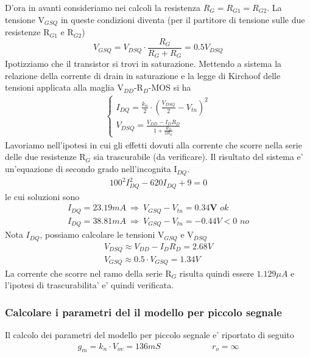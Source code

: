 \documentclass[a4paper,10pt]{article}
\begin{document}
D'ora in avanti consideriamo nei calcoli la resistenza $R_G=R_{G1}=R_{G2}$. La tensione V$_{GSQ}$ in queste condizioni diventa (per il partitore di tensione sulle due resistenze R$_{G1}$ e R$_{G2}$)
\begin{equation*}
V_{GSQ} = V_{DSQ} \cdot \frac{R_{G}}{R_{G}+R_G} = 0.5 V_{DSQ}
\end{equation*}
Ipotizziamo che il transistor si trovi in saturazione. Mettendo a sistema la relazione della corrente di drain in saturazione e la legge di Kirchoof delle tensioni applicata alla maglia V$_{DD}$-R$_D$-MOS si ha
\begin{align*}
	\begin{cases}
		I_{DQ} = \frac{k_n}{2} \cdot (\frac{V_{DSQ}}{2}-V_{tn})^2 \\[4pt]
		V_{DSQ} = \frac{V_{DD}-I_DR_D}{1+\frac{R_D}{2R_G}}
	\end{cases}
\end{align*}
Lavoriamo nell'ipotesi in cui gli effetti dovuti alla corrente che scorre nella serie delle due resistenze R$_G$ sia trascurabile (da verificare). Il risultato del sistema e' un'equazione di secondo grado nell'incognita I$_{DQ}$.
\begin{align*}
100^2 I_{DQ}^2 - 620 I_{DQ} + 9 = 0 
\end{align*}
le cui soluzioni sono
\begin{align*}
I_{DQ} = 23.19mA \ \Rightarrow \  V_{GSQ} - V_{tn} = \mathbf{0.34V}  \textit{  ok}\\
I_{DQ} = 38.81mA \  \Rightarrow \ V_{GSQ} - V_{tn} = -0.44V < 0 \textit{  no}
\end{align*}
Nota $I_{DQ}$, possiamo calcolare le tensioni V$_{GSQ}$ e V$_{DSQ}$
\begin{gather*}
V_{DSQ} \approx V_{DD} - I_DR_D = 2.68V \\
V_{GSQ} \approx 0.5 \cdot V_{GSQ} = 1.34V
\end{gather*}
La corrente che scorre nel ramo della serie R$_G$ risulta quindi essere $1.129\mu A$ e l'ipotesi di trascurabilita' e' quindi verificata.
\newpage

\subsubsection{Calcolare i parametri del il modello per piccolo segnale}
Il calcolo dei parametri del modello per piccolo segnale e' riportato di seguito
\begin{align*}
g_m = k_n \cdot V_{ov} = 136mS \qquad \qquad \qquad r_o = \infty
\end{align*}
\end{document}
